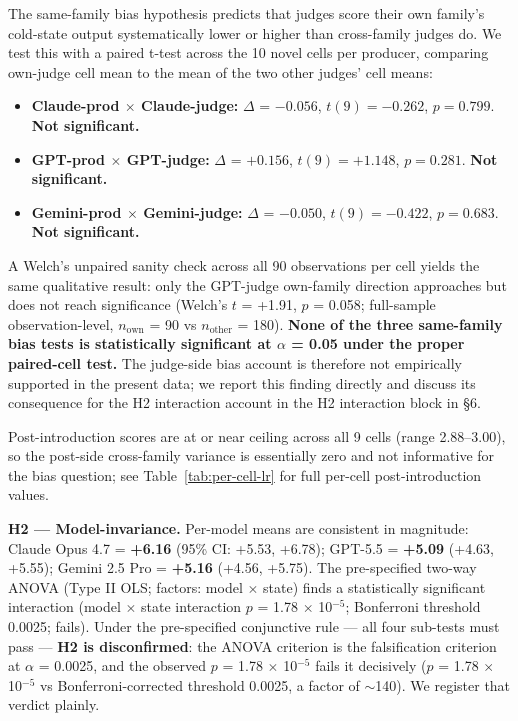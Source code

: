 \documentclass[11pt,a4paper]{article}
\begin{document}
The same-family bias hypothesis predicts that judges score their own family's cold-state output systematically lower or higher than cross-family judges do. We test this with a paired t-test across the 10 novel cells per producer, comparing own-judge cell mean to the mean of the two other judges' cell means:

\begin{itemize}
  \item \textbf{Claude-prod $\times$ Claude-judge:} $\Delta$ = $-0.056$, $t(9) = -0.262$, $p = 0.799$. \textbf{Not significant.}
  \item \textbf{GPT-prod $\times$ GPT-judge:} $\Delta$ = $+0.156$, $t(9) = +1.148$, $p = 0.281$. \textbf{Not significant.}
  \item \textbf{Gemini-prod $\times$ Gemini-judge:} $\Delta$ = $-0.050$, $t(9) = -0.422$, $p = 0.683$. \textbf{Not significant.}
\end{itemize}

A Welch's unpaired sanity check across all 90 observations per cell yields the same qualitative result: only the GPT-judge own-family direction approaches but does not reach significance (Welch's $t$ = +1.91, $p$ = 0.058; full-sample observation-level, $n_{\text{own}}$ = 90 vs $n_{\text{other}}$ = 180). \textbf{None of the three same-family bias tests is statistically significant at $\alpha$ = 0.05 under the proper paired-cell test.} The judge-side bias account is therefore not empirically supported in the present data; we report this finding directly and discuss its consequence for the H2 interaction account in the H2 interaction block in \S6.

Post-introduction scores are at or near ceiling across all 9 cells (range 2.88--3.00), so the post-side cross-family variance is essentially zero and not informative for the bias question; see Table~\ref{tab:per-cell-lr} for full per-cell post-introduction values.

\textbf{H2 --- Model-invariance.} Per-model means are consistent in magnitude: Claude Opus 4.7 = \textbf{+6.16} (95\% CI: +5.53, +6.78); GPT-5.5 = \textbf{+5.09} (+4.63, +5.55); Gemini 2.5 Pro = \textbf{+5.16} (+4.56, +5.75). The pre-specified two-way ANOVA (Type II OLS; factors: model $\times$ state) finds a statistically significant interaction (model $\times$ state interaction $p$ = 1.78 $\times$ 10$^{-5}$; Bonferroni threshold 0.0025; fails). Under the pre-specified conjunctive rule --- all four sub-tests must pass --- \textbf{H2 is disconfirmed}: the ANOVA criterion is the falsification criterion at $\alpha$ = 0.0025, and the observed $p$ = 1.78 $\times$ 10$^{-5}$ fails it decisively ($p$ = 1.78 $\times$ 10$^{-5}$ vs Bonferroni-corrected threshold 0.0025, a factor of $\sim$140). We register that verdict plainly.
\end{document}
